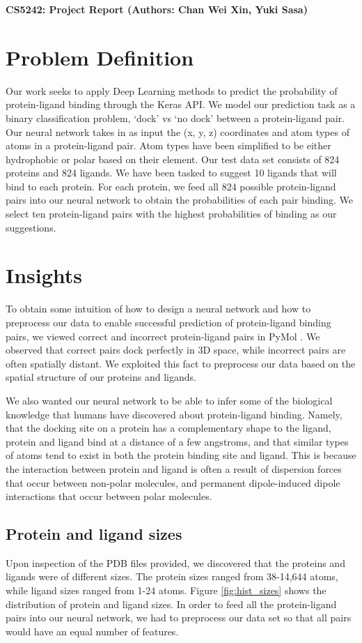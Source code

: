 \documentclass[11pt]{article}
\begin{document}
{\Large{\textbf{CS5242: Project Report (Authors: Chan Wei Xin, Yuki Sasa)}}}
\section{Problem Definition}
Our work seeks to apply Deep Learning methods to predict the probability of protein-ligand binding through the Keras API. We model our prediction task as a binary classification problem, ‘dock’ vs ‘no dock’ between a protein-ligand pair. Our neural network takes in as input the (x, y, z) coordinates and atom types of atoms in a protein-ligand pair. Atom types have been simplified to be either hydrophobic or polar based on their element. Our test data set consists of 824 proteins and 824 ligands. We have been tasked to suggest 10 ligands that will bind to each protein. For each protein, we feed all 824 possible protein-ligand pairs into our neural network to obtain the probabilities of each pair binding. We select ten protein-ligand pairs with the highest probabilities of binding as our suggestions.

\section{Insights}
To obtain some intuition of how to design a neural network and  how to preprocess our data to enable successful prediction of protein-ligand binding pairs, we viewed correct and incorrect protein-ligand pairs in PyMol \cite{delano2002pymol}. We observed that correct pairs dock perfectly in 3D space, while incorrect pairs are often spatially distant. We exploited this fact to preprocess our data based on the spatial structure of our proteins and ligands.

We also wanted our neural network to be able to infer some of the biological knowledge that humans have discovered about protein-ligand binding. Namely, that the docking site on a protein has a complementary shape to the ligand, protein and ligand bind at a distance of a few angstroms, and that similar types of atoms tend to exist in both the protein binding site and ligand. This is because the interaction between protein and ligand is often a result of dispersion forces that occur between non-polar molecules, and permanent dipole-induced dipole interactions that occur between polar molecules. 

\subsection{Protein and ligand sizes}
Upon inspection of the PDB files provided, we discovered that the proteins and ligands were of different sizes. The protein sizes ranged from 38-14,644 atoms, while ligand sizes ranged from 1-24 atoms. Figure \ref{fig:hist_sizes} shows the distribution of protein and ligand sizes. In order to feed all the protein-ligand pairs into our neural network, we had to preprocess our data set so that all pairs would have an equal number of features.
\end{document}
